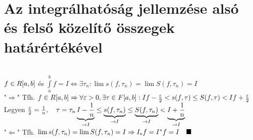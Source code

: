 \documentclass[a4paper,11pt]{article}
\begin{document}
\section{Az integrálhatóság jellemzése alsó és felső közelítő összegek \\ határértékével}
\tetel\\[0.2cm]$f\in R[a,b]$ és $\int\limits_{a}^{b}f=I\Leftrightarrow
\exists\tau_n:\lim s(f,\tau_n)=\lim S(f,\tau_n)=I$\\[0.2cm]\biz
"$\Rightarrow$" Tfh. $f\in R[a,b]\Rightarrow\forall\varepsilon>0,\exists\tau\in F[a,b]:
If-\frac{\varepsilon}{2}<s(f,\tau)\leq S(f,\tau)<If+\frac{\varepsilon}{2}$
\\[0.2cm]Legyen $\frac{\varepsilon}{2}=\frac{1}{n},\quad\tau=\tau_n\\[0.2cm]
\underbrace{I-\frac{1}{n}}_{\to I}\leq\underbrace{s(f,\tau_n)}_{\to I}\leq
\underbrace{S(f,\tau_n)}_{\to I}<\underbrace{I+\frac{1}{n}}_{\to I}$
\\[0.2cm]"$\Leftarrow$" Tfh. $\lim s(f,\tau_n)=\lim S(f,\tau_n)=I\Rightarrow
I_*f=I^*f=I\quad\blacksquare$\newpage
\end{document}
